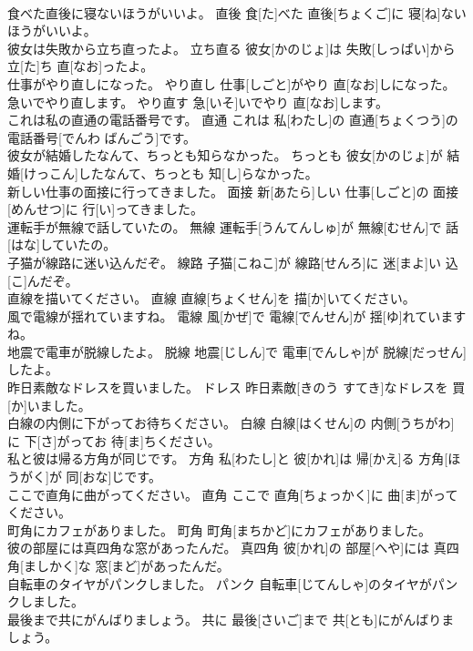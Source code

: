 \documentclass[8pt]{extreport}
\begin{document}
\begin{CJK}{UTF8}{min}
\\	食べた直後に寝ないほうがいいよ。	直後	食[た]べた 直後[ちょくご]に 寝[ね]ないほうがいいよ。	
\\	彼女は失敗から立ち直ったよ。	立ち直る	彼女[かのじょ]は 失敗[しっぱい]から 立[た]ち 直[なお]ったよ。	
\\	仕事がやり直しになった。	やり直し	仕事[しごと]がやり 直[なお]しになった。	
\\	急いでやり直します。	やり直す	急[いそ]いでやり 直[なお]します。	
\\	これは私の直通の電話番号です。	直通	これは 私[わたし]の 直通[ちょくつう]の 電話番号[でんわ ばんごう]です。	
\\	彼女が結婚したなんて、ちっとも知らなかった。	ちっとも	彼女[かのじょ]が 結婚[けっこん]したなんて、ちっとも 知[し]らなかった。	
\\	新しい仕事の面接に行ってきました。	面接	新[あたら]しい 仕事[しごと]の 面接[めんせつ]に 行[い]ってきました。	
\\	運転手が無線で話していたの。	無線	運転手[うんてんしゅ]が 無線[むせん]で 話[はな]していたの。	
\\	子猫が線路に迷い込んだぞ。	線路	子猫[こねこ]が 線路[せんろ]に 迷[まよ]い 込[こ]んだぞ。	
\\	直線を描いてください。	直線	直線[ちょくせん]を 描[か]いてください。	
\\	風で電線が揺れていますね。	電線	風[かぜ]で 電線[でんせん]が 揺[ゆ]れていますね。	
\\	地震で電車が脱線したよ。	脱線	地震[じしん]で 電車[でんしゃ]が 脱線[だっせん]したよ。	
\\	昨日素敵なドレスを買いました。	ドレス	昨日素敵[きのう すてき]なドレスを 買[か]いました。	
\\	白線の内側に下がってお待ちください。	白線	白線[はくせん]の 内側[うちがわ]に 下[さ]がってお 待[ま]ちください。	
\\	私と彼は帰る方角が同じです。	方角	私[わたし]と 彼[かれ]は 帰[かえ]る 方角[ほうがく]が 同[おな]じです。	
\\	ここで直角に曲がってください。	直角	ここで 直角[ちょっかく]に 曲[ま]がってください。	
\\	町角にカフェがありました。	町角	町角[まちかど]にカフェがありました。	
\\	彼の部屋には真四角な窓があったんだ。	真四角	彼[かれ]の 部屋[へや]には 真四角[ましかく]な 窓[まど]があったんだ。	
\\	自転車のタイヤがパンクしました。	パンク	自転車[じてんしゃ]のタイヤがパンクしました。	
\\	最後まで共にがんばりましょう。	共に	最後[さいご]まで 共[とも]にがんばりましょう。	

\end{CJK}
\end{document}
